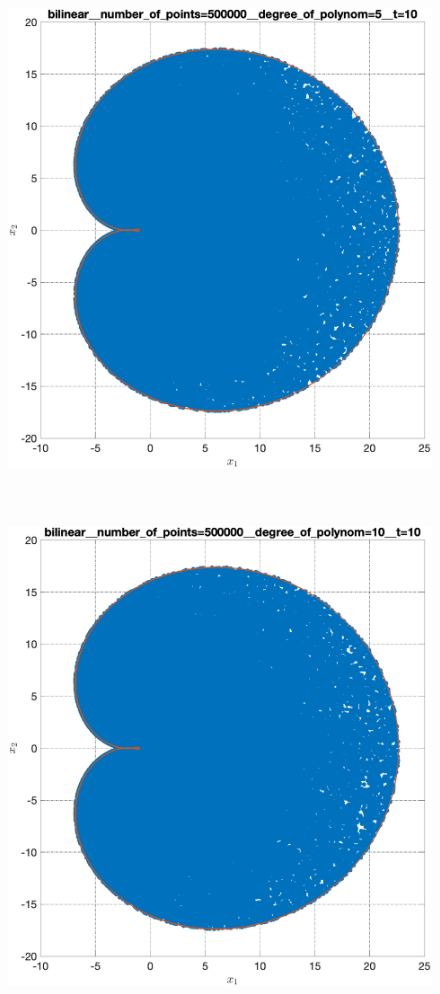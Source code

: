 \documentclass[../main.tex]{subfiles}
\begin{document}
\begin{figure}[ht!]
\begin{minipage}[b]{.3\linewidth}
 		\includegraphics[width=\linewidth]{images/bilinear__number_of_points=500000__degree_of_polynom=5__t=10.eps}
 	\end{minipage} 
 	\hfill
 	\begin{minipage}[b]{.3\linewidth} 
 		\small
 		\centering
 		\includegraphics[width=\linewidth]{images/bilinear__number_of_points=500000__degree_of_polynom=10__t=10.eps}

\end{minipage}
\end{figure}
\end{document}
